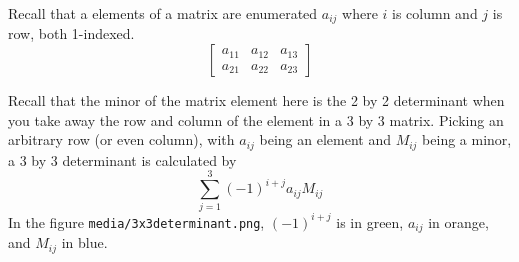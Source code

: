 \documentclass[11pt]{article}
\theoremstyle{definition}
\begin{document}
Recall that a elements of a matrix are enumerated $a_{ij}$ where $i$ is column and $j$ is row, both 1-indexed. 
\[\begin{bmatrix}
  a_{11} & a_{12} & a_{13}\\
  a_{21} & a_{22} & a_{23}
\end{bmatrix}\]

Recall that the minor of the matrix element here is the 2 by 2 determinant when you take away the row and column of the element in a 3 by 3 matrix.  Picking an arbitrary row (or even column), with $a_{ij}$ being an element and $M_{ij}$ being a minor, a 3 by 3 determinant is calculated by 
\[ \sum_{j=1}^{3} (-1)^{i+j} a_{ij} M_{ij} \]
In the figure \texttt{media/3x3determinant.png}, $(-1)^{i+j}$ is in green, $a_{ij}$ in orange, and $M_{ij}$ in blue.






\end{document}
